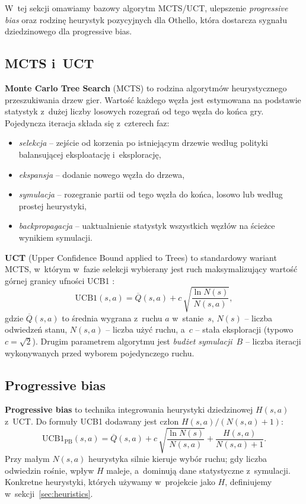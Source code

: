 \documentclass[11pt,a4paper]{article}
\begin{document}
W~tej sekcji omawiamy bazowy algorytm MCTS/UCT, ulepszenie \emph{progressive bias} oraz rodzinę heurystyk pozycyjnych dla Othello, która dostarcza sygnału dziedzinowego dla progressive bias.

\subsection{MCTS i~UCT}

\textbf{Monte Carlo Tree Search} (MCTS) \cite{coulom2007efficient,browne2012survey} to rodzina algorytmów heurystycznego przeszukiwania drzew gier. Wartość każdego węzła jest estymowana na podstawie statystyk z~dużej liczby losowych rozegrań od tego węzła do końca gry. Pojedyncza iteracja składa się z~czterech faz:
\begin{itemize}[leftmargin=1.5em,itemsep=2pt]
    \item \emph{selekcja} -- zejście od korzenia po istniejącym drzewie według polityki balansującej eksploatację i~eksplorację,
    \item \emph{ekspansja} -- dodanie nowego węzła do drzewa,
    \item \emph{symulacja} -- rozegranie partii od tego węzła do końca, losowo lub według prostej heurystyki,
    \item \emph{backpropagacja} -- uaktualnienie statystyk wszystkich węzłów na ścieżce wynikiem symulacji.
\end{itemize}

\textbf{UCT} (Upper Confidence Bound applied to Trees) \cite{kocsis2006bandit} to standardowy wariant MCTS, w~którym w~fazie selekcji wybierany jest ruch maksymalizujący wartość górnej granicy ufności UCB1 \cite{auer2002finite}:
\[
\mathrm{UCB1}(s, a) = \overline{Q}(s, a) + c\,\sqrt{\frac{\ln N(s)}{N(s, a)}},
\]
gdzie $\overline{Q}(s,a)$ to średnia wygrana z~ruchu $a$ w~stanie~$s$, $N(s)$ -- liczba odwiedzeń stanu, $N(s,a)$ -- liczba użyć ruchu, a~$c$ -- stała eksploracji (typowo $c = \sqrt{2}$). Drugim parametrem algorytmu jest \emph{budżet symulacji}~$B$ -- liczba iteracji wykonywanych przed wyborem pojedynczego ruchu.

\subsection{Progressive bias}\label{sec:pb}

\textbf{Progressive bias} \cite{chaslot2008progressive} to technika integrowania heurystyki dziedzinowej $H(s, a)$ z~UCT. Do formuły UCB1 dodawany jest człon $H(s,a) / (N(s,a) + 1)$:
\[
\mathrm{UCB1}_{\text{PB}}(s, a) = \overline{Q}(s, a) + c\,\sqrt{\frac{\ln N(s)}{N(s, a)}} + \frac{H(s, a)}{N(s, a) + 1}.
\]
Przy małym $N(s, a)$ heurystyka silnie kieruje wybór ruchu; gdy liczba odwiedzin rośnie, wpływ $H$ maleje, a~dominują dane statystyczne z~symulacji. Konkretne heurystyki, których używamy w~projekcie jako $H$, definiujemy w~sekcji~\ref{sec:heuristics}.
\end{document}
